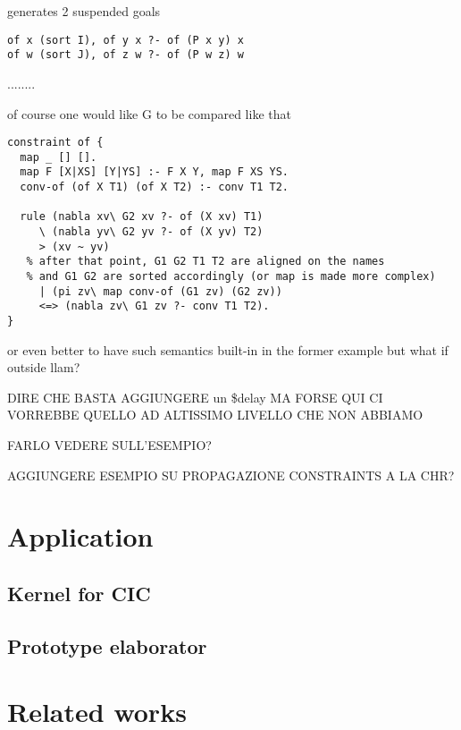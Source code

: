 \documentclass{easychair}
\begin{document}
generates 2 suspended goals

\begin{verbatim}
of x (sort I), of y x ?- of (P x y) x
of w (sort J), of z w ?- of (P w z) w
\end{verbatim}

........

of course one would like G to be compared like that

\begin{verbatim}
constraint of {
  map _ [] [].
  map F [X|XS] [Y|YS] :- F X Y, map F XS YS.
  conv-of (of X T1) (of X T2) :- conv T1 T2.

  rule (nabla xv\ G2 xv ?- of (X xv) T1)
     \ (nabla yv\ G2 yv ?- of (X yv) T2)
     > (xv ~ yv)
   % after that point, G1 G2 T1 T2 are aligned on the names
   % and G1 G2 are sorted accordingly (or map is made more complex)
     | (pi zv\ map conv-of (G1 zv) (G2 zv))
     <=> (nabla zv\ G1 zv ?- conv T1 T2).
}
\end{verbatim}

or even better to have such semantics built-in in the former example
but what if outside llam?


DIRE CHE BASTA AGGIUNGERE un \$delay MA FORSE QUI CI VORREBBE QUELLO AD ALTISSIMO LIVELLO CHE NON ABBIAMO

FARLO VEDERE SULL'ESEMPIO?

AGGIUNGERE ESEMPIO SU PROPAGAZIONE CONSTRAINTS A LA CHR?

\section{Application}

\subsection{Kernel for CIC}



\subsection{Prototype elaborator}


\section{Related works}
\end{document}
